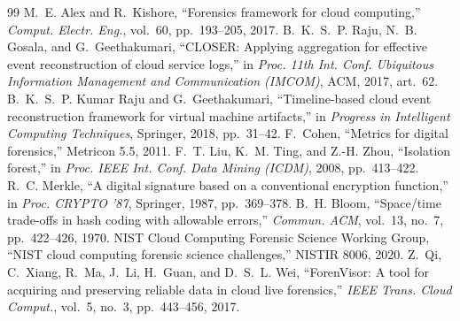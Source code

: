 \documentclass[conference,10pt]{IEEEtran}
\begin{document}
\begin{thebibliography}{99}
 M.~E. Alex and R.~Kishore, ``Forensics framework for cloud computing,'' \emph{Comput. Electr. Eng.}, vol.~60, pp.~193--205, 2017.
 B.~K.~S.~P. Raju, N.~B. Gosala, and G.~Geethakumari, ``CLOSER: Applying aggregation for effective event reconstruction of cloud service logs,'' in \emph{Proc. 11th Int. Conf. Ubiquitous Information Management and Communication (IMCOM)}, ACM, 2017, art.~62.
 B.~K.~S.~P. Kumar Raju and G.~Geethakumari, ``Timeline-based cloud event reconstruction framework for virtual machine artifacts,'' in \emph{Progress in Intelligent Computing Techniques}, Springer, 2018, pp.~31--42.
 F.~Cohen, ``Metrics for digital forensics,'' Metricon 5.5, 2011.
 F.~T. Liu, K.~M. Ting, and Z.-H. Zhou, ``Isolation forest,'' in \emph{Proc. IEEE Int. Conf. Data Mining (ICDM)}, 2008, pp.~413--422.
 R.~C. Merkle, ``A digital signature based on a conventional encryption function,'' in \emph{Proc. CRYPTO '87}, Springer, 1987, pp.~369--378.
 B.~H. Bloom, ``Space/time trade-offs in hash coding with allowable errors,'' \emph{Commun. ACM}, vol.~13, no.~7, pp.~422--426, 1970.
 NIST Cloud Computing Forensic Science Working Group, ``NIST cloud computing forensic science challenges,'' NISTIR 8006, 2020.
 Z.~Qi, C.~Xiang, R.~Ma, J.~Li, H.~Guan, and D.~S.~L. Wei, ``ForenVisor: A tool for acquiring and preserving reliable data in cloud live forensics,'' \emph{IEEE Trans. Cloud Comput.}, vol.~5, no.~3, pp.~443--456, 2017.
\end{thebibliography}
\end{document}
